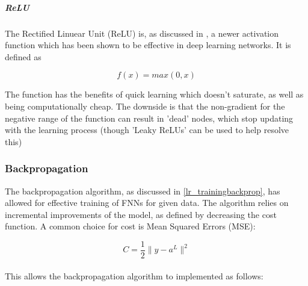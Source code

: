 \documentclass[a4paper,latin]{paper}
\begin{document}
\subparagraph{ReLU}

The Rectified Linuear Unit (ReLU) is, as discussed in , a newer activation function which has been shown to be effective in deep learning networks. It is defined as

\begin{equation}\label{func_relu}
f(x) = max(0, x)
\end{equation}

The function has the benefits of quick learning which doesn't saturate, as well as being computationally cheap. The downside is that the non-gradient for the negative range of the function can result in 'dead' nodes, which stop updating with the learning process (though 'Leaky ReLUs' can be used to help resolve this)

\subsubsection{Backpropagation}\label{imp_backprop}

The backpropagation algorithm, as discussed in \ref{lr_trainingbackprop}, has allowed for effective training of FNNs for given data. The algorithm relies on incremental improvements of the model, as defined by decreasing the cost function. A common choice for cost is Mean Squared Errors (MSE):

\begin{equation}\label{function_MSE}
C = \frac{1}{2} \rVert y - a^L \rVert^2
\end{equation}
~\\
This allows the backpropagation algorithm to implemented as follows:
\end{document}
